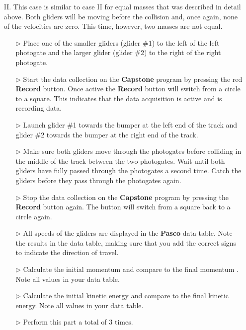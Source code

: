 \begin{itemize}
\item[II.] This case is similar to case II for equal masses that was described in detail above. Both gliders will be moving before the collision and, once again, none of the velocities are zero.  This time, however, two masses are not equal.

  \begin{itemize}
  \item[$\triangleright$] Place one of the smaller gliders (glider \#1) to the left of the left photogate and the larger glider (glider \#2) to the right of the right photogate.
  \item[$\triangleright$] Start the data collection on the \textbf{Capstone} program by pressing the red \textbf{Record} button. Once active the \textbf{Record} button will switch from a circle to a square. This indicates that the data acquisition is active and is recording data.
  \item[$\triangleright$] Launch glider \#1 towards the bumper at the left end of the track and glider \#2 towards the bumper at the right end of the track.
  \item[$\triangleright$] Make sure both gliders move through the photogates before colliding in the middle of the track between the two photogates. Wait until both gliders have fully passed through the photogates a second time. Catch the gliders before they pass through the photogates again.
  \item[$\triangleright$] Stop the data collection on the \textbf{Capstone} program by pressing the \textbf{Record} button again. The button will switch from a square back to a circle again.
  \item[$\triangleright$] All speeds of the gliders are displayed in the \textbf{Pasco} data table. Note the results in the data table, making sure that you add the correct signs to indicate the direction of travel.
  \item[$\triangleright$] Calculate the initial momentum and compare to the final momentum . Note all values in your data table.
  \item[$\triangleright$] Calculate the initial kinetic energy and compare to the final kinetic energy. Note all values in your data table.
  \item[$\triangleright$] Perform this part a total of 3 times.
  \end{itemize}
\end{itemize}

